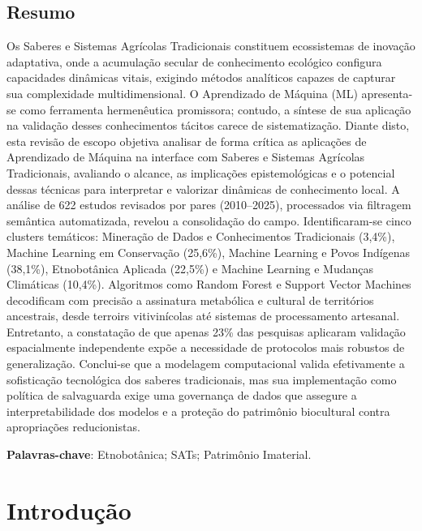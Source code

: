 \begin{resumoumacoluna}
\section*{Resumo}
Os Saberes e Sistemas Agrícolas Tradicionais constituem ecossistemas de inovação adaptativa, onde a acumulação secular de conhecimento ecológico configura capacidades dinâmicas vitais, exigindo métodos analíticos capazes de capturar sua complexidade multidimensional. O Aprendizado de Máquina (ML) apresenta-se como ferramenta hermenêutica promissora; contudo, a síntese de sua aplicação na validação desses conhecimentos tácitos carece de sistematização. Diante disto, esta revisão de escopo objetiva analisar de forma crítica as aplicações de Aprendizado de Máquina na interface com Saberes e Sistemas Agrícolas Tradicionais, avaliando o alcance, as implicações epistemológicas e o potencial dessas técnicas para interpretar e valorizar dinâmicas de conhecimento local. A análise de 622 estudos revisados por pares (2010--2025), processados via filtragem semântica automatizada, revelou a consolidação do campo. Identificaram-se cinco clusters temáticos: Mineração de Dados e Conhecimentos Tradicionais (3,4\%), Machine Learning em Conservação (25,6\%), Machine Learning e Povos Indígenas (38,1\%), Etnobotânica Aplicada (22,5\%) e Machine Learning e Mudanças Climáticas (10,4\%). Algoritmos como Random Forest e Support Vector Machines decodificam com precisão a assinatura metabólica e cultural de territórios ancestrais, desde terroirs vitivinícolas até sistemas de processamento artesanal. Entretanto, a constatação de que apenas 23\% das pesquisas aplicaram validação espacialmente independente expõe a necessidade de protocolos mais robustos de generalização. Conclui-se que a modelagem computacional valida efetivamente a sofisticação tecnológica dos saberes tradicionais, mas sua implementação como política de salvaguarda exige uma governança de dados que assegure a interpretabilidade dos modelos e a proteção do patrimônio biocultural contra apropriações reducionistas.

\vspace{\onelineskip}
\noindent
\textbf{Palavras-chave}: Etnobotânica; SATs; Patrimônio Imaterial.
\end{resumoumacoluna}

\newpage

\section{Introdução}

